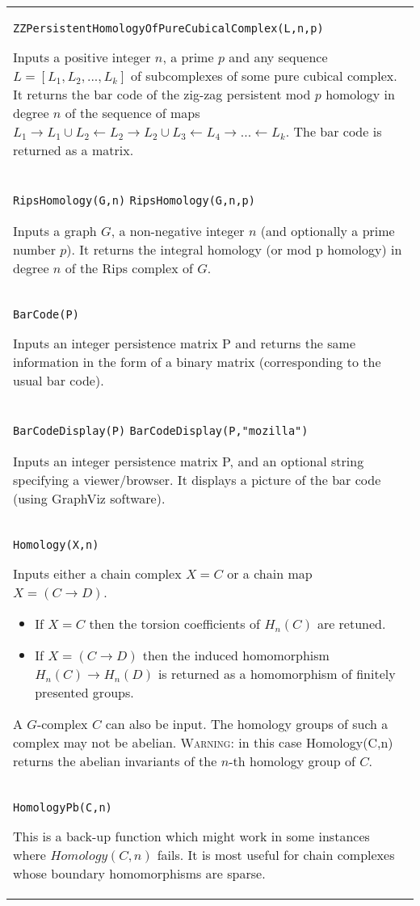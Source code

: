 \documentclass[a4paper,11pt]{report}
\begin{document}
{\begin{center}
\begin{tabular}{|l|}
 \\
 \index{ZZPersistentHomologyOfPureCubicalComplex} \texttt{ZZPersistentHomologyOfPureCubicalComplex(L,n,p)} 

 Inputs a positive integer $n$, a prime $p$ and any sequence $L=[L_1, L_2, ..., L_k]$ of subcomplexes of some pure cubical complex. It returns the bar code of the
zig-zag persistent mod $p$ homology in degree $n$ of the sequence of maps $L_1 \rightarrow L_1 \cup L_2 \leftarrow L_2 \rightarrow L_2 \cup L_3
\leftarrow L_4 \rightarrow ... \leftarrow L_k$. The bar code is returned as a matrix. 

 \\
 \index{RipsHomology} \texttt{RipsHomology(G,n)} \texttt{RipsHomology(G,n,p)} 

 Inputs a graph $G$, a non-negative integer $n$ (and optionally a prime number $p$). It returns the integral homology (or mod p homology) in degree $n$ of the Rips complex of $G$. \\
 \index{BarCode} \texttt{BarCode(P)} 

 Inputs an integer persistence matrix P and returns the same information in the
form of a binary matrix (corresponding to the usual bar code). \\
 \index{BarCodeDisplay} \texttt{BarCodeDisplay(P)} \texttt{BarCodeDisplay(P,"mozilla")} 

 Inputs an integer persistence matrix P, and an optional string specifying a
viewer/browser. It displays a picture of the bar code (using GraphViz
software). \\
 \index{Homology} \texttt{Homology(X,n)} 

 Inputs either a chain complex $X=C$ or a chain map $X=(C \longrightarrow D)$. 
\begin{itemize}
\item If $X=C$ then the torsion coefficients of $H_n(C)$ are retuned.
\item  If $X=(C \longrightarrow D)$ then the induced homomorphism $H_n(C) \longrightarrow H_n(D)$ is returned as a homomorphism of finitely presented groups. 
\end{itemize}
 A $G$-complex $C$ can also be input. The homology groups of such a complex may not be abelian. \textsc{Warning:} in this case Homology(C,n) returns the abelian invariants of the $n$-th homology group of $C$. \\
 \index{HomologyPb} \texttt{HomologyPb(C,n)} 

 This is a back-up function which might work in some instances where $Homology(C,n)$ fails. It is most useful for chain complexes whose boundary homomorphisms are
sparse. 


\end{tabular}
\end{center}}
\end{document}
